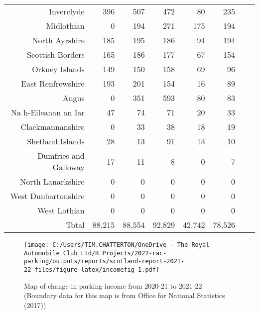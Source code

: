 \documentclass[
  12pt,
]{article}
\begin{document}
\begin{longtable}[t]{rrrrrrrr}
Inverclyde & 396 & 507 & 472 & 80 & 235 & \cellcolor{white}{ 193.8\%} & \cellcolor{white}{-12.2\%}\\
Midlothian & 0 & 194 & 271 & 175 & 194 & \cellcolor{white}{  10.9\%} & \cellcolor{white}{}\\
North Ayrshire & 185 & 195 & 186 & 94 & 194 & \cellcolor{white}{ 106.4\%} & \cellcolor{white}{  1.2\%}\\
Scottish Borders & 165 & 186 & 177 & 67 & 154 & \cellcolor{white}{ 129.9\%} & \cellcolor{white}{ -1.7\%}\\
Orkney Islands & 149 & 150 & 158 & 69 & 96 & \cellcolor{white}{  39.1\%} & \cellcolor{white}{-10.4\%}\\
East Renfrewshire & 193 & 201 & 154 & 16 & 89 & \cellcolor{white}{ 456.2\%} & \cellcolor{white}{-17.6\%}\\
Angus & 0 & 351 & 593 & 80 & 83 & \cellcolor{white}{   3.8\%} & \cellcolor{white}{}\\
Na h-Eileanan an Iar & 47 & 74 & 71 & 20 & 33 & \cellcolor{white}{  65.0\%} & \cellcolor{white}{ -8.5\%}\\
Clackmannanshire & 0 & 33 & 38 & 18 & 19 & \cellcolor{white}{   5.6\%} & \cellcolor{white}{}\\
Shetland Islands & 28 & 13 & 91 & 13 & 10 & \cellcolor{white}{ -23.1\%} & \cellcolor{white}{-22.7\%}\\
Dumfries and Galloway & 17 & 11 & 8 & 0 & 7 & \cellcolor{white}{} & \cellcolor{white}{-19.9\%}\\
North Lanarkshire & 0 & 0 & 0 & 0 & 0 & \cellcolor{white}{   0.0\%} & \cellcolor{white}{  0.0\%}\\
West Dunbartonshire & 0 & 0 & 0 & 0 & 0 & \cellcolor{white}{   0.0\%} & \cellcolor{white}{  0.0\%}\\
West Lothian & 0 & 0 & 0 & 0 & 0 & \cellcolor{white}{   0.0\%} & \cellcolor{white}{  0.0\%}\\
\midrule
Total & 88,215 & 88,554 & 92,829 & 42,742 & 78,526 & \cellcolor{white}{  83.7\%} & \cellcolor{white}{ -2.9\%}\\*
\end{longtable}
\endgroup{}

\begin{figure}
\centering
\texttt{[image: C:/Users/TIM.CHATTERTON/OneDrive - The Royal Automobile Club Ltd/R Projects/2022-rac-parking/outputs/reports/scotland-report-2021-22\_files/figure-latex/incomefig-1.pdf]}
\caption{\label{fig:incomefig}Map of change in parking income from 2020-21 to 2021-22 (Boundary data for this map is from Office for National Statistics (2017))}
\end{figure}
\end{document}
